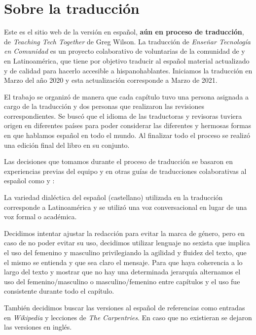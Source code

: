 \chapter*{Sobre la traducción}\label{s:traduccion}

Este es el sitio web de la versión en español, \textbf{aún en proceso de traducción}, de \emph{Teaching Tech Together} de Greg Wilson.
La traducción de \emph{Enseñar Tecnología en Comunidad} es un proyecto colaborativo
de voluntarias de la comunidad de  y 
 en Latinoamérica,
que tiene por objetivo traducir al español material actualizado 
y de calidad para hacerlo accesible a hispanohablantes.
Iniciamos la traducción en Marzo del año 2020 y esta actualización corresponde a Marzo de 2021.

El trabajo se organizó de manera que cada capítulo tuvo una persona asignada a cargo de la traducción 
y dos personas que realizaron las revisiones correspondientes.  
Se buscó que el idioma de las traductoras y revisoras tuviera origen en diferentes países para
poder considerar las diferentes y hermosas formas en que hablamos español en todo el mundo.
Al finalizar todo el proceso se realizó una edición final del libro en su conjunto.

Las decisiones que tomamos durante el proceso de traducción se basaron en experiencias previas
del equipo y en otras guías de traducciones colaborativas al español como 
y :

La variedad dialéctica del español (castellano) utilizada en la traducción corresponde 
a Latinoamérica y se utilizó una voz conversacional en lugar de una voz formal o académica.

Decidimos intentar ajustar la redacción para evitar la marca de género, pero
en caso de no poder evitar su uso, decidimos utilizar lenguaje no sexista  
que implica el uso del femenino y masculino privilegiando la agilidad y fluidez del texto, 
que el mismo se entienda y que sea claro el mensaje. Para que haya coherencia 
a lo largo del texto y mostrar que no hay una determinada jerarquía 
alternamos el uso del femenino/masculino o masculino/femenino entre capítulos 
y el uso fue consistente durante todo el capítulo. 

También decidimos buscar las versiones al español de referencias como 
entradas en \emph{Wikipedia} y lecciones de \emph{The Carpentries}.  En caso que no existieran 
se dejaron las versiones en inglés.

